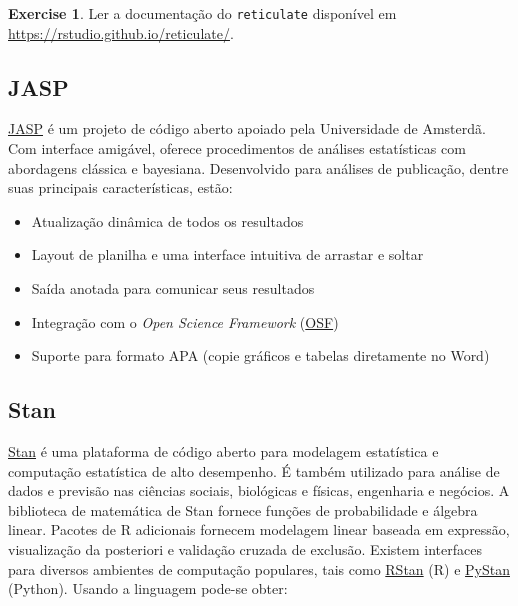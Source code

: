 \documentclass[
]{book}
\providecommand{\tightlist}{%
  \setlength{\itemsep}{0pt}\setlength{\parskip}{0pt}}
\theoremstyle{definition}
\theoremstyle{definition}
\theoremstyle{definition}
\newtheorem{exercise}{Exercise}[chapter]
\theoremstyle{remark}
\begin{document}
\begin{exercise}
\protect\hypertarget{exr:reticulate}{}{\label{exr:reticulate} }Ler a documentação do \texttt{reticulate} disponível em \url{https://rstudio.github.io/reticulate/}.
\end{exercise}

\hypertarget{jasp}{%
\subsection{JASP}\label{jasp}}

\href{https://jasp-stats.org/}{JASP} é um projeto de código aberto apoiado pela Universidade de Amsterdã. Com interface amigável, oferece procedimentos de análises estatísticas com abordagens clássica e bayesiana. Desenvolvido para análises de publicação, dentre suas principais características, estão:

\begin{itemize}
\tightlist
\item
  Atualização dinâmica de todos os resultados\\
\item
  Layout de planilha e uma interface intuitiva de arrastar e soltar\\
\item
  Saída anotada para comunicar seus resultados\\
\item
  Integração com o \emph{Open Science Framework} (\href{https://osf.io/}{OSF})\\
\item
  Suporte para formato APA (copie gráficos e tabelas diretamente no Word)
\end{itemize}

\hypertarget{stan}{%
\subsection{Stan}\label{stan}}

\href{https://mc-stan.org/}{Stan} é uma plataforma de código aberto para modelagem estatística e computação estatística de alto desempenho. É também utilizado para análise de dados e previsão nas ciências sociais, biológicas e físicas, engenharia e negócios. A biblioteca de matemática de Stan fornece funções de probabilidade e álgebra linear. Pacotes de R adicionais fornecem modelagem linear baseada em expressão, visualização da posteriori e validação cruzada de exclusão. Existem interfaces para diversos ambientes de computação populares, tais como \href{https://mc-stan.org/users/interfaces/rstan.html}{RStan} (R) e \href{https://mc-stan.org/users/interfaces/pystan.html}{PyStan} (Python). Usando a linguagem pode-se obter:
\end{document}
